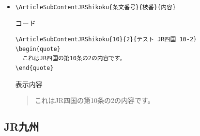 \documentclass[oneside,10pt,a4paper]{jsarticle}
\begin{document}
\begin{itemize}
\begin{itembox}[l]{表示内容}
\begin{quote}
        \end{quote}
      \end{itembox}
    \item \verb|\ArticleSubContentJRShikoku{条文番号}{枝番}{内容}|
      \begin{itembox}[l]{コード}
        \begin{verbatim}
\ArticleSubContentJRShikoku{10}{2}{テスト JR四国 10-2}
\begin{quote}
  これはJR四国の第10条の2の内容です。
\end{quote}\end{verbatim}
      \end{itembox}
      \begin{itembox}[l]{表示内容}
        \begin{quote}
          これはJR四国の第10条の2の内容です。
        \end{quote}
      \end{itembox}
  \end{itemize}

  \newpage

  \subsection{JR九州}
\end{document}
